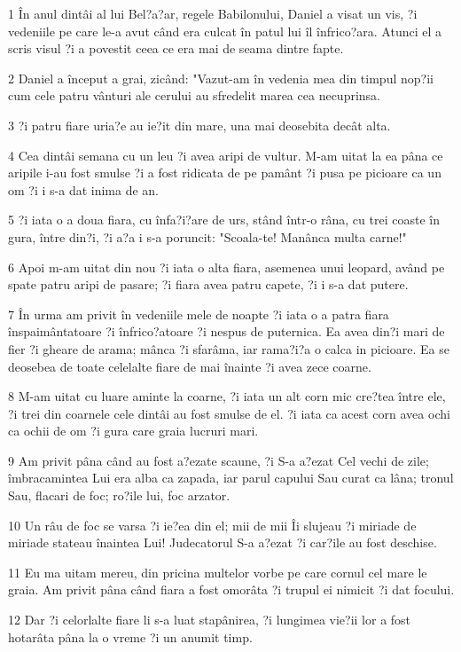\par 1 În anul dintâi al lui Bel?a?ar, regele Babilonului, Daniel a visat un vis, ?i vedeniile pe care le-a avut când era culcat în patul lui îl înfrico?ara. Atunci el a scris visul ?i a povestit ceea ce era mai de seama dintre fapte.
\par 2 Daniel a început a grai, zicând: "Vazut-am în vedenia mea din timpul nop?ii cum cele patru vânturi ale cerului au sfredelit marea cea necuprinsa.
\par 3 ?i patru fiare uria?e au ie?it din mare, una mai deosebita decât alta.
\par 4 Cea dintâi semana cu un leu ?i avea aripi de vultur. M-am uitat la ea pâna ce aripile i-au fost smulse ?i a fost ridicata de pe pamânt ?i pusa pe picioare ca un om ?i i s-a dat inima de an.
\par 5 ?i iata o a doua fiara, cu înfa?i?are de urs, stând într-o râna, cu trei coaste în gura, între din?i, ?i a?a i s-a poruncit: "Scoala-te! Manânca multa carne!"
\par 6 Apoi m-am uitat din nou ?i iata o alta fiara, asemenea unui leopard, având pe spate patru aripi de pasare; ?i fiara avea patru capete, ?i i s-a dat putere.
\par 7 În urma am privit în vedeniile mele de noapte ?i iata o a patra fiara înspaimântatoare ?i înfrico?atoare ?i nespus de puternica. Ea avea din?i mari de fier ?i gheare de arama; mânca ?i sfarâma, iar rama?i?a o calca in picioare. Ea se deosebea de toate celelalte fiare de mai înainte ?i avea zece coarne.
\par 8 M-am uitat cu luare aminte la coarne, ?i iata un alt corn mic cre?tea între ele, ?i trei din coarnele cele dintâi au fost smulse de el. ?i iata ca acest corn avea ochi ca ochii de om ?i gura care graia lucruri mari.
\par 9 Am privit pâna când au fost a?ezate scaune, ?i S-a a?ezat Cel vechi de zile; îmbracamintea Lui era alba ca zapada, iar parul capului Sau curat ca lâna; tronul Sau, flacari de foc; ro?ile lui, foc arzator.
\par 10 Un râu de foc se varsa ?i ie?ea din el; mii de mii Îi slujeau ?i miriade de miriade stateau înaintea Lui! Judecatorul S-a a?ezat ?i car?ile au fost deschise.
\par 11 Eu ma uitam mereu, din pricina multelor vorbe pe care cornul cel mare le graia. Am privit pâna când fiara a fost omorâta ?i trupul ei nimicit ?i dat focului.
\par 12 Dar ?i celorlalte fiare li s-a luat stapânirea, ?i lungimea vie?ii lor a fost hotarâta pâna la o vreme ?i un anumit timp.
